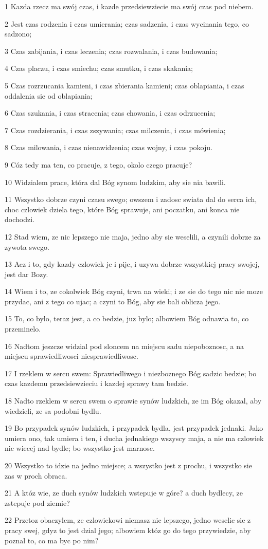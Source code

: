 \par 1 Kazda rzecz ma swój czas, i kazde przedsiewziecie ma swój czas pod niebem.
\par 2 Jest czas rodzenia i czas umierania; czas sadzenia, i czas wycinania tego, co sadzono;
\par 3 Czas zabijania, i czas leczenia; czas rozwalania, i czas budowania;
\par 4 Czas placzu, i czas smiechu; czas smutku, i czas skakania;
\par 5 Czas rozrzucania kamieni, i czas zbierania kamieni; czas oblapiania, i czas oddalenia sie od oblapiania;
\par 6 Czas szukania, i czas stracenia; czas chowania, i czas odrzucenia;
\par 7 Czas rozdzierania, i czas zszywania; czas milczenia, i czas mówienia;
\par 8 Czas milowania, i czas nienawidzenia; czas wojny, i czas pokoju.
\par 9 Cóz tedy ma ten, co pracuje, z tego, okolo czego pracuje?
\par 10 Widzialem prace, która dal Bóg synom ludzkim, aby sie nia bawili.
\par 11 Wszystko dobrze czyni czasu swego; owszem i zadosc swiata dal do serca ich, choc czlowiek dziela tego, które Bóg sprawuje, ani poczatku, ani konca nie dochodzi.
\par 12 Stad wiem, ze nic lepszego nie maja, jedno aby sie weselili, a czynili dobrze za zywota swego.
\par 13 Acz i to, gdy kazdy czlowiek je i pije, i uzywa dobrze wszystkiej pracy swojej, jest dar Bozy.
\par 14 Wiem i to, ze cokolwiek Bóg czyni, trwa na wieki; i ze sie do tego nic nie moze przydac, ani z tego co ujac; a czyni to Bóg, aby sie bali oblicza jego.
\par 15 To, co bylo, teraz jest, a co bedzie, juz bylo; albowiem Bóg odnawia to, co przeminelo.
\par 16 Nadtom jeszcze widzial pod sloncem na miejscu sadu niepoboznosc, a na miejscu sprawiedliwosci niesprawiedliwosc.
\par 17 I rzeklem w sercu swem: Sprawiedliwego i niezboznego Bóg sadzic bedzie; bo czas kazdemu przedsiewzieciu i kazdej sprawy tam bedzie.
\par 18 Nadto rzeklem w sercu swem o sprawie synów ludzkich, ze im Bóg okazal, aby wiedzieli, ze sa podobni bydlu.
\par 19 Bo przypadek synów ludzkich, i przypadek bydla, jest przypadek jednaki. Jako umiera ono, tak umiera i ten, i ducha jednakiego wszyscy maja, a nie ma czlowiek nic wiecej nad bydle; bo wszystko jest marnosc.
\par 20 Wszystko to idzie na jedno miejsce; a wszystko jest z prochu, i wszystko sie zas w proch obraca.
\par 21 A któz wie, ze duch synów ludzkich wstepuje w góre? a duch bydlecy, ze zstepuje pod ziemie?
\par 22 Przetoz obaczylem, ze czlowiekowi niemasz nic lepszego, jedno weselic sie z pracy swej, gdyz to jest dzial jego; albowiem któz go do tego przywiedzie, aby poznal to, co ma byc po nim?

